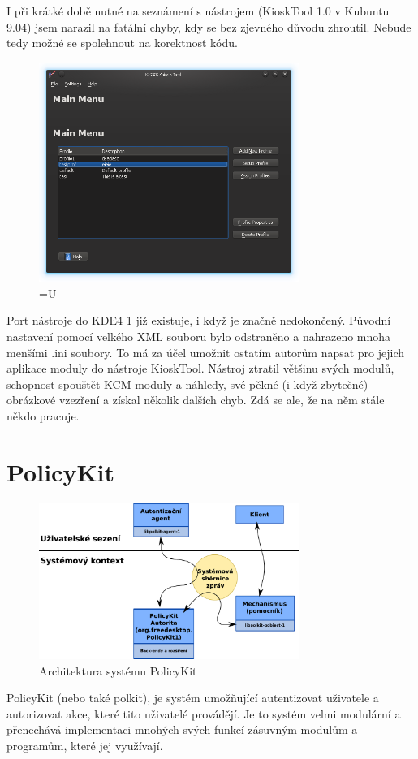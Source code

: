 I při krátké době nutné na seznámení s nástrojem (KioskTool 1.0 v Kubuntu 9.04)
jsem narazil na fatální chyby, kdy se bez zjevného důvodu zhroutil. Nebude tedy
možné se spolehnout na korektnost kódu.

\begin{figure}[h]
    \centering
    \includegraphics[width=8.5cm]{obrazky/KioskToolKDE4/kiosktool_kde4.png}
    \caption{=U}
    \label{fig:kt4_uvod}
\end{figure}

Port nástroje do KDE4 \ref{fig:kt4_uvod} již existuje, i když je značně
nedokončený.  %
Původní nastavení pomocí velkého XML souboru bylo odstraněno a nahrazeno mnoha
menšími .ini soubory. To má za účel umožnit ostatím autorům napsat pro jejich
aplikace moduly do nástroje KioskTool. Nástroj ztratil většinu svých modulů,
schopnost spouštět KCM moduly a náhledy, své pěkné (i když zbytečné) obrázkové
vzezření a získal několik dalších chyb. Zdá se ale, že na něm stále někdo
pracuje. %

\section{PolicyKit}
\begin{figure}[h]
    \centering
    \includegraphics[width=8.5cm]{obrazky/polkit-architecture-vector-cz.pdf}
    \caption{Architektura systému PolicyKit}
    \label{fig:polkit_arch}
\end{figure}
PolicyKit (nebo také polkit), je systém umožňující autentizovat uživatele
a autorizovat akce, které tito uživatelé provádějí. Je to systém velmi modulární
a přenechává implementaci mnohých svých funkcí zásuvným modulům a programům,
které jej využívají.

